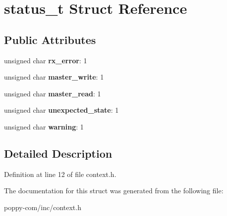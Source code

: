 \hypertarget{structstatus__t}{\section{status\-\_\-t \-Struct \-Reference}
\label{structstatus__t}
}
\subsection*{\-Public \-Attributes}
\begin{DoxyCompactItemize}
\item 
\hypertarget{structstatus__t_a05b4fada97158d7782b74b89761f802e}{unsigned char {\bfseries rx\-\_\-error}\-: 1}\label{structstatus__t_a05b4fada97158d7782b74b89761f802e}

\item 
\hypertarget{structstatus__t_a26afaab7b173abb25ef5546fdcf116a8}{unsigned char {\bfseries master\-\_\-write}\-: 1}\label{structstatus__t_a26afaab7b173abb25ef5546fdcf116a8}

\item 
\hypertarget{structstatus__t_a553cbc2843d8456e899f4a2b9ed7e7e2}{unsigned char {\bfseries master\-\_\-read}\-: 1}\label{structstatus__t_a553cbc2843d8456e899f4a2b9ed7e7e2}

\item 
\hypertarget{structstatus__t_a5093c9c2b8c9b89eaa42b71edb58b1f4}{unsigned char {\bfseries unexpected\-\_\-state}\-: 1}\label{structstatus__t_a5093c9c2b8c9b89eaa42b71edb58b1f4}

\item 
\hypertarget{structstatus__t_a2fbf2dc7cfe9e06e2bc33706e3ab6593}{unsigned char {\bfseries warning}\-: 1}\label{structstatus__t_a2fbf2dc7cfe9e06e2bc33706e3ab6593}

\end{DoxyCompactItemize}


\subsection{\-Detailed \-Description}


\-Definition at line 12 of file context.\-h.



\-The documentation for this struct was generated from the following file\-:\begin{DoxyCompactItemize}
\item 
poppy-\/com/inc/context.\-h\end{DoxyCompactItemize}

